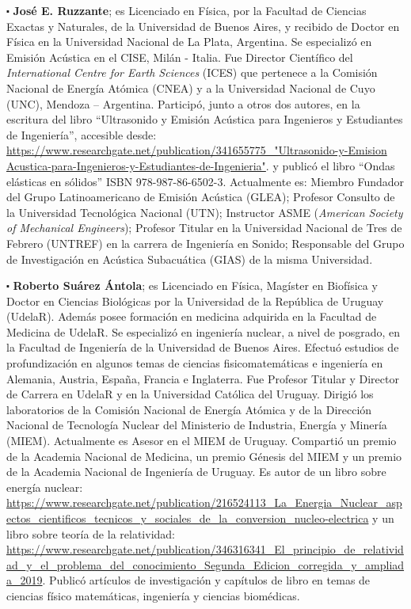 \documentclass[
11pt, %
spanish,
singlespacing, %
parskip, %
headsepline, %
]{MastersDoctoralThesis} %
\begin{document}
\begin{sloppypar}


$\centerdot$ \textbf{José E. Ruzzante}; es Licenciado en Física, por la Facultad de Ciencias Exactas y Naturales, de la Universidad de Buenos Aires, y recibido de Doctor en Física en la Universidad Nacional de La Plata, Argentina. Se especializó en Emisión Acústica en el CISE, Milán - Italia. Fue Director Científico del \textit{International Centre for Earth Sciences} (ICES) que pertenece a la Comisión Nacional de Energía Atómica (CNEA) y a la Universidad Nacional de Cuyo (UNC), Mendoza – Argentina. Participó, junto a otros dos autores, en la escritura del libro “Ultrasonido y Emisión Acústica para Ingenieros y Estudiantes de Ingeniería”, accesible desde: \url{https://www.researchgate.net/publication/341655775_"Ultrasonido-y-Emision Acustica-para-Ingenieros-y-Estudiantes-de-Ingenieria"}. y publicó el libro “Ondas elásticas en sólidos” ISBN 978-987-86-6502-3.
 Actualmente es:  Miembro Fundador del Grupo Latinoamericano de Emisión Acústica (GLEA);  Profesor Consulto de la Universidad Tecnológica Nacional (UTN);  Instructor ASME (\textit{American Society of Mechanical Engineers}); Profesor Titular en la Universidad Nacional de Tres de Febrero (UNTREF) en la carrera de Ingeniería en Sonido;  Responsable del Grupo de Investigación en Acústica Subacuática (GIAS) de la misma Universidad.
 
$\centerdot$ \textbf{Roberto Suárez Ántola}; es Licenciado en Física, Magíster en Biofísica y Doctor en Ciencias Biológicas por la Universidad de la República de Uruguay (UdelaR).  Además posee formación en medicina adquirida en la Facultad de Medicina de UdelaR. Se especializó en ingeniería nuclear, a nivel de posgrado, en la Facultad de Ingeniería de la Universidad de Buenos Aires. Efectuó estudios de profundización en algunos temas de ciencias fisicomatemáticas e ingeniería en Alemania, Austria, España, Francia e Inglaterra.
Fue Profesor Titular y Director de Carrera en UdelaR y en la Universidad Católica del Uruguay. Dirigió los laboratorios de la Comisión Nacional de Energía Atómica y de la Dirección Nacional de Tecnología Nuclear del Ministerio de Industria, Energía y Minería (MIEM). Actualmente es Asesor en el MIEM de Uruguay. Compartió un premio de la Academia Nacional de Medicina, un premio Génesis del MIEM y un premio de la Academia Nacional de Ingeniería de Uruguay. Es autor de un libro sobre energía nuclear: \url{https://www.researchgate.net/publication/216524113_La_Energia_Nuclear_aspectos_cientificos_tecnicos_y_sociales_de_la_conversion_nucleo-electrica} y un libro sobre teoría de la relatividad: \url{https://www.researchgate.net/publication/346316341_El_principio_de_relatividad_y_el_problema_del_conocimiento_Segunda_Edicion_corregida_y_ampliada_2019}. Publicó artículos de investigación y capítulos de libro en temas de ciencias físico matemáticas, ingeniería y ciencias biomédicas.


\end{sloppypar}
\end{document}
